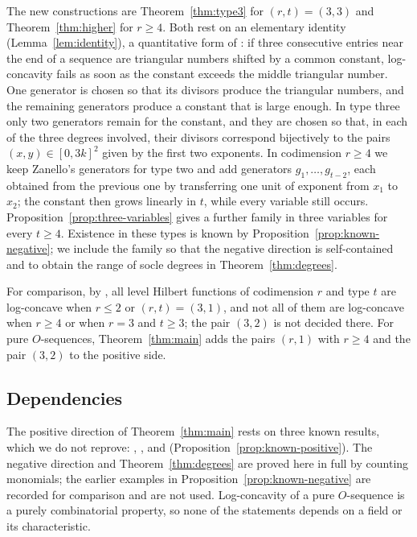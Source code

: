\documentclass{amsart}
\theoremstyle{definition}
\theoremstyle{remark}
\begin{document}
The new constructions are Theorem~\ref{thm:type3} for $(r,t)=(3,3)$ and Theorem~\ref{thm:higher} for $r\ge 4$. Both rest on an elementary identity (Lemma~\ref{lem:identity}), a quantitative form of \cite[Lemma~3]{Za}: if three consecutive entries near the end of a sequence are triangular numbers shifted by a common constant, log-concavity fails as soon as the constant exceeds the middle triangular number. One generator is chosen so that its divisors produce the triangular numbers, and the remaining generators produce a constant that is large enough. In type three only two generators remain for the constant, and they are chosen so that, in each of the three degrees involved, their divisors correspond bijectively to the pairs $(x,y)\in[0,3k]^2$ given by the first two exponents. In codimension $r\ge 4$ we keep Zanello's generators for type two and add generators $g_1,\dots,g_{t-2}$, each obtained from the previous one by transferring one unit of exponent from $x_1$ to $x_2$; the constant then grows linearly in $t$, while every variable still occurs. Proposition~\ref{prop:three-variables} gives a further family in three variables for every $t\ge 4$. Existence in these types is known by Proposition~\ref{prop:known-negative}; we include the family so that the negative direction is self-contained and to obtain the range of socle degrees in Theorem~\ref{thm:degrees}.

For comparison, by \cite[Theorem~5]{Za}, all level Hilbert functions of codimension $r$ and type $t$ are log-concave when $r\le 2$ or $(r,t)=(3,1)$, and not all of them are log-concave when $r\ge 4$ or when $r=3$ and $t\ge 3$; the pair $(3,2)$ is not decided there. For pure $O$-sequences, Theorem~\ref{thm:main} adds the pairs $(r,1)$ with $r\ge 4$ and the pair $(3,2)$ to the positive side.

\subsection*{Dependencies}
The positive direction of Theorem~\ref{thm:main} rests on three known results, which we do not reprove: \cite[Proposition~4.3(i)]{Ia}, \cite[Proposition~7]{Za}, and \cite[Appendix~B.4]{TKS} (Proposition~\ref{prop:known-positive}). The negative direction and Theorem~\ref{thm:degrees} are proved here in full by counting monomials; the earlier examples in Proposition~\ref{prop:known-negative} are recorded for comparison and are not used. Log-concavity of a pure $O$-sequence is a purely combinatorial property, so none of the statements depends on a field or its characteristic.
\end{document}
